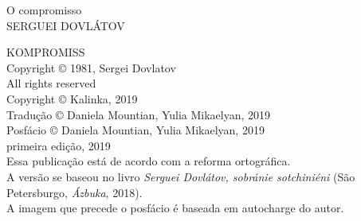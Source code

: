 \noindent{}O compromisso\\
SERGUEI DOVLÁTOV

\newpage
\pagestyle{empty}
\MyriadPro
\scriptsize
\begin{center}
KOMPROMISS\\[6pt]

Copyright © 1981, Sergei Dovlatov\\[6pt]

All rights reserved\\[20pt]

Copyright © Kalinka, 2019\\[6pt]

Tradução © Daniela Mountian, Yulia Mikaelyan, 2019\\[6pt]

Posfácio © Daniela Mountian, Yulia Mikaelyan, 2019\\[6pt]

primeira edição, 2019\\[40pt]


Essa publicação está de acordo com a reforma ortográfica.\\[6pt]
A versão se baseou no livro \emph{Serguei Dovlátov, sobránie sotchiniéni} (São Petersburgo, \emph{Ázbuka}, 2018).\\[6pt]	
A imagem que precede o posfácio é baseada em autocharge do autor.\\[20pt]
\end{center}


\bigskip

